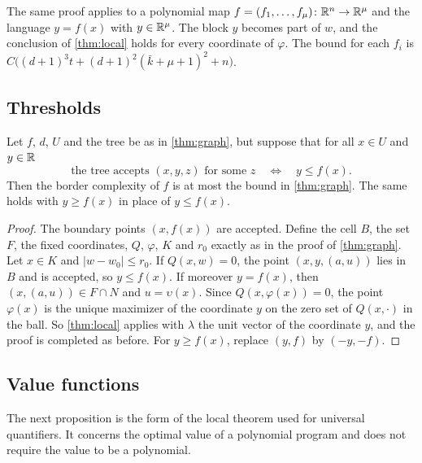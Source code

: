 \begin{remark}\label{rem:several}
The same proof applies to a polynomial map $f=(f_1,\dots,f_\mu)\colon\mathbb{R}^n\to\mathbb{R}^\mu$ and the language $y=f(x)$ with $y\in\mathbb{R}^\mu$. The block $y$ becomes part of $w$, and the conclusion of \cref{thm:local} holds for every coordinate of $\varphi$. The bound for each $f_i$ is $C\bigl((d+1)^3t+(d+1)^2(\bar k+\mu+1)^2+n\bigr)$.
\end{remark}

\subsection{Thresholds}

\begin{theorem}\label{thm:threshold}
Let $f$, $d$, $U$ and the tree be as in \cref{thm:graph}, but suppose that for all $x\in U$ and $y\in\mathbb{R}$
\[
\text{the tree accepts }(x,y,z)\text{ for some }z\quad\Longleftrightarrow\quad y\le f(x).
\]
Then the border complexity of $f$ is at most the bound in \cref{thm:graph}. The same holds with $y\ge f(x)$ in place of $y\le f(x)$.
\end{theorem}

\begin{proof}
The boundary points $(x,f(x))$ are accepted. Define the cell $B$, the set $F$, the fixed coordinates, $Q$, $\varphi$, $K$ and $r_0$ exactly as in the proof of \cref{thm:graph}. Let $x\in K$ and $|w-w_0|\le r_0$. If $Q(x,w)=0$, the point $(x,y,(a,u))$ lies in $B$ and is accepted, so $y\le f(x)$. If moreover $y=f(x)$, then $(x,(a,u))\in F\cap N$ and $u=\upsilon(x)$. Since $Q(x,\varphi(x))=0$, the point $\varphi(x)$ is the unique maximizer of the coordinate $y$ on the zero set of $Q(x,\cdot)$ in the ball. So \cref{thm:local} applies with $\lambda$ the unit vector of the coordinate $y$, and the proof is completed as before. For $y\ge f(x)$, replace $(y,f)$ by $(-y,-f)$.
\end{proof}

\subsection{Value functions}

The next proposition is the form of the local theorem used for universal quantifiers. It concerns the optimal value of a polynomial program and does not require the value to be a polynomial.

